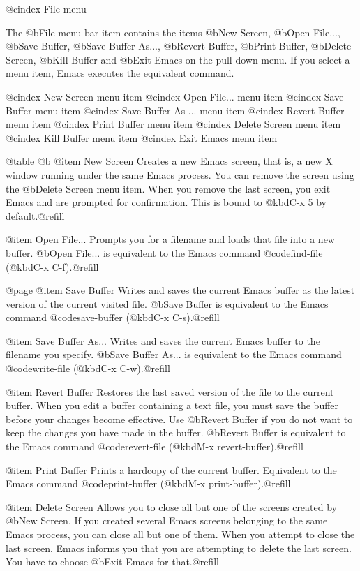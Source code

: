 {{@cindex File menu

The @b{File} menu bar item contains the items @b{New Screen}, @b{Open
File...}, @b{Save Buffer}, @b{Save Buffer As...}, @b{Revert Buffer},
@b{Print Buffer}, @b{Delete Screen}, @b{Kill Buffer} and @b{Exit Emacs}
on the pull-down menu.  If you select a menu item, Emacs executes the
equivalent command.

@cindex New Screen menu item
@cindex Open File... menu item
@cindex Save Buffer menu item
@cindex Save Buffer As ... menu item
@cindex Revert Buffer menu item
@cindex Print Buffer menu item
@cindex Delete Screen menu item
@cindex Kill Buffer menu item
@cindex Exit Emacs menu item

@table @b
@item New Screen
Creates a new Emacs screen, that is, a new X window running under the
same Emacs process.  You can remove the screen using the @b{Delete
Screen} menu item. When you remove the last screen, you exit Emacs and
are prompted for confirmation.  This is bound to @kbd{C-x 5} by 
default.@refill

@item Open File...
Prompts you for a filename and loads that file into a new buffer. 
@b{Open File...} is equivalent to the Emacs command @code{find-file} (@kbd{C-x
C-f}).@refill 

@page
@item Save Buffer 
Writes and saves the current Emacs buffer as the latest
version of the current visited file.  @b{Save Buffer} is equivalent to the
Emacs command @code{save-buffer} (@kbd{C-x C-s}).@refill

@item Save Buffer As... 
Writes and saves the current Emacs buffer to the filename you specify.
@b{Save Buffer As...} is equivalent to the Emacs command
@code{write-file} (@kbd{C-x C-w}).@refill

@item Revert Buffer
Restores the last saved version of the file to the current buffer.  When
you edit a buffer containing a text file, you must save the buffer
before your changes become effective.  Use @b{Revert Buffer} if you do
not want to keep the changes you have made in the buffer.  @b{Revert
Buffer} is equivalent to the Emacs command @code{revert-file} (@kbd{M-x
revert-buffer}).@refill

@item Print Buffer
Prints a hardcopy of the current buffer.  Equivalent
to the Emacs command @code{print-buffer} (@kbd{M-x print-buffer}).@refill

@item Delete Screen 
Allows you to close all but one of the screens created by @b{New Screen}.
If you created several Emacs screens belonging to the same Emacs
process, you can close all but one of them.  When you attempt to close the
last screen, Emacs informs you that you are attempting to delete the
last screen.  You have to choose @b{Exit Emacs} for that.@refill

}}
